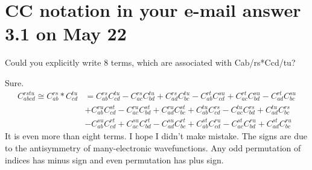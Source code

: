 \documentclass{exam}
\begin{document}
\section{CC notation in your e-mail answer 3.1 on May 22}
\begin{questions}

%
\question Could you explicitly write 8 terms, which are associated with Cab/rs*Ccd/tu?

\begin{solution}
Sure. 
\begin{align}
 C_{abcd}^{rstu} \cong C_{ab}^{rs} * C_{cd}^{tu} 
  &= C_{ab}^{rs}  C_{cd}^{tu} - C_{ac}^{rs}  C_{bd}^{tu} + C_{ad}^{rs}  C_{bc}^{tu} 
   - C_{ab}^{rt}  C_{cd}^{su} + C_{ac}^{rt}  C_{bd}^{su} - C_{ad}^{rt}  C_{bc}^{su} \\
  &+ C_{ab}^{ru}  C_{cd}^{st} - C_{ac}^{ru}  C_{bd}^{st} + C_{ad}^{ru}  C_{bc}^{st} 
   + C_{ab}^{tu}  C_{cd}^{rs} - C_{ac}^{tu}  C_{bd}^{rs} + C_{ad}^{tu}  C_{bc}^{rs} \\
  &- C_{ab}^{su}  C_{cd}^{rt} + C_{ac}^{su}  C_{bd}^{rt} - C_{ad}^{su}  C_{bc}^{rt} 
   + C_{ab}^{st}  C_{cd}^{ru} - C_{ac}^{st}  C_{bd}^{ru} + C_{ad}^{st}  C_{bc}^{ru}
\end{align}
It is even more than eight terms. 
I hope I didn't make mistake. The signs are due to the antisymmetry of many-electronic wavefunctions.
Any odd permutation of indices has minus sign and even permutation has plus sign.
\end{solution}
\end{questions}
\end{document}
